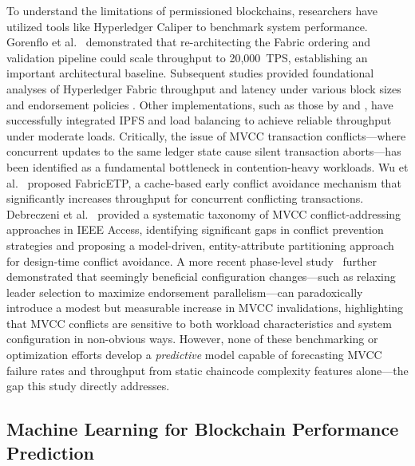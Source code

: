 \documentclass[manuscript,screen]{acmart}
\begin{document}
To understand the limitations of permissioned blockchains, researchers have utilized tools like Hyperledger Caliper to benchmark system performance. Gorenflo et al.~\citep{gorenflo_fastfabric_2019} demonstrated that re-architecting the Fabric ordering and validation pipeline could scale throughput to 20,000~TPS, establishing an important architectural baseline. Subsequent studies provided foundational analyses of Hyperledger Fabric throughput and latency under various block sizes and endorsement policies \citep{thakkar_performance_2018,el_hajji_optimization_2024}. Other implementations, such as those by \cite{kumar_integrating_2026} and \cite{kaushal_convergence_2025}, have successfully integrated IPFS and load balancing to achieve reliable throughput under moderate loads. Critically, the issue of MVCC transaction conflicts---where concurrent updates to the same ledger state cause silent transaction aborts---has been identified as a fundamental bottleneck in contention-heavy workloads. Wu et al.~\citep{wu_fabricetp_2023} proposed FabricETP, a cache-based early conflict avoidance mechanism that significantly increases throughput for concurrent conflicting transactions. Debreczeni et al.~\citep{debreczeni_transaction_2024} provided a systematic taxonomy of MVCC conflict-addressing approaches in IEEE Access, identifying significant gaps in conflict prevention strategies and proposing a model-driven, entity-attribute partitioning approach for design-time conflict avoidance. A more recent phase-level study~\citep{gorenflo_endtoend_2026} further demonstrated that seemingly beneficial configuration changes---such as relaxing leader selection to maximize endorsement parallelism---can paradoxically introduce a modest but measurable increase in MVCC invalidations, highlighting that MVCC conflicts are sensitive to both workload characteristics and system configuration in non-obvious ways. However, none of these benchmarking or optimization efforts develop a \textit{predictive} model capable of forecasting MVCC failure rates and throughput from static chaincode complexity features alone---the gap this study directly addresses.

\subsection{Machine Learning for Blockchain Performance Prediction}
\end{document}
